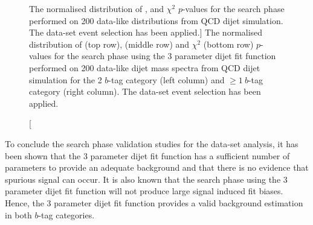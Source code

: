 \begin{figure}[!thb]
\begin{center}
  \end{center}
  \vspace{-1em}
  \caption
      [The normalised distribution of \bh{}, \dhunt{} and $\chi^{2}$  \mbox{$p$-value}s for
        the search phase performed on 200 data-like distributions from QCD dijet simulation.
        The \summer{} data-set event selection has been applied.]
      {The normalised distribution of \bh{} (top row),  \dhunt{} (middle row) and $\chi^{2}$ (bottom row) \mbox{$p$-value}s for
        the search phase using the 3 parameter dijet fit function performed on
        200 data-like dijet mass spectra from QCD dijet simulation
        for the 2 $b$-tag category (left column) and $\geq1~b$-tag category (right column).
        The \summer{} data-set event selection has been applied.
        \label{fig:pValueHists}}

\end{figure}

To conclude the search phase validation studies for the \summer{} data-set analysis,
it has been shown that the 3 parameter dijet fit function has a
sufficient number of parameters to provide an adequate background
and that there is no evidence that spurious signal can occur.
It is also known that the search phase using the 3 parameter dijet fit function
will not produce large signal induced fit biases.
Hence, the 3 parameter dijet fit function
provides a valid background estimation in both $b$-tag categories.


